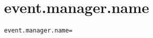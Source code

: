 \section{event.manager.name}
\label{configuration:EventManagerName}
\AvailableInJavaOnly{\TODO}
\begin{lstlisting}[style=Props,caption={Usage example for \textit{event.manager.name}}]
event.manager.name=
\end{lstlisting}